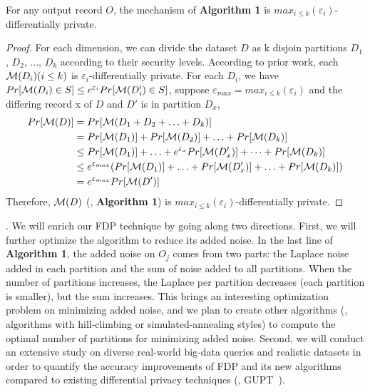 \begin{theorem}
  For any output record $O$, the
  mechanism of \textbf{Algorithm 1} is $max_{i \le 
k}(\varepsilon_i)$-differentially private.
\end{theorem}
\begin{proof}
  For each dimension, we can divide the dataset $D$ as k disjoin partitions
$D_1$, $D_2$,
  ..., $D_k$ according to their security levels. According to 
prior work\cite{pointestimation:smith08},
  each ${\cal M}(D_i)(i \le k)$ is $\varepsilon_i$-differentially private.
  For each $D_i$, we have $Pr[{\cal M}(D_i) \in S] \le e^{\varepsilon_i}Pr[{\cal M}(D'_i) \in 
S]$, suppose $\varepsilon_{max} = max_{i \le k}(\varepsilon_i)$ and the 
differing record x of $D$ and $D'$ is in partition $D_x$, \\
  \vspace{-0.1in}
  \begin{equation} \label{eq1}
  \begin{split}
  Pr[{\cal M}(D)] & = Pr[{\cal M}(D_1 + D_2 + \ldots + D_k)] \\
   & = Pr[{\cal M}(D_1)] + Pr[{\cal M}(D_2)] + \ldots + Pr[{\cal M}(D_k)] \\
   & \le Pr[{\cal M}(D_1)] + \ldots + e^{\varepsilon_x}Pr[{\cal M}(D'_x)] + 
\dots + Pr[{\cal M}(D_k)] \\
   & \le  e^{\varepsilon_{max}}(Pr[{\cal M}(D_1)] + \ldots + Pr[{\cal 
M}(D'_x)] + \ldots + Pr[{\cal M}(D_k)]) \\
   & = e^{\varepsilon_{max}}Pr[{\cal M}(D')]
  \end{split}
  \end{equation}
  Therefore, ${\cal M}(D)$ (\ie, \textbf{Algorithm 1}) is $max_{i \le 
k}(\varepsilon_i)$-differentially private.
\end{proof}

. We will enrich our FDP technique by going 
along two directions. First, we will further optimize the algorithm to 
reduce its added noise. In the last line of \textbf{Algorithm 1}, the added 
noise on $O_j$ comes from two parts: the Laplace noise added in each partition 
and the sum of noise added to all partitions. When the number of partitions 
increases, the Laplace per partition decreases (each partition is smaller), but 
the sum increases. This brings an interesting optimization problem on 
minimizing added noise, and we plan to create other algorithms (\eg, 
algorithms with hill-climbing or simulated-annealing styles) to compute the 
optimal number of partitions for minimizing added noise. Second, 
we will conduct an extensive study on diverse real-world big-data queries and 
realistic datasets in order to quantify the accuracy improvements of FDP and 
its new algorithms compared to existing differential privacy techniques (\eg, 
GUPT~\cite{gupt:sigmod12}).

